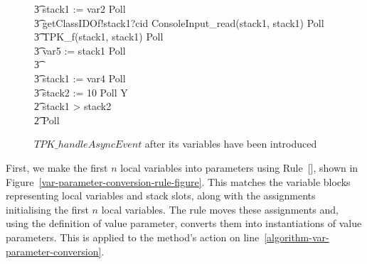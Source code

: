 \begin{figure}[tp!]
\begin{circusaction}
    \t3 stack1 := var2 \circseq Poll \circseq \\
    \t3 getClassIDOf!stack1?cid \then ConsoleInput\_read(stack1, stack1) \circseq Poll \circseq \\
    \t3 TPK\_f(stack1, stack1) \circseq Poll \circseq \\
    \t3 var5 := stack1 \circseq Poll \circseq \\
    \t3 {} \cdots {} \\
    \t3 stack1 := var4 \circseq Poll \circseq \\
    \t3 stack2 := 10 \circseq Poll \circseq Y \\
    \t2 {} \circelse stack1 > stack2 \circthen \Skip \\
    \t2 \circfi \circseq Poll
  \end{circusaction}
  \caption{$TPK\_handleAsyncEvent$ after its variables have been introduced}
  \label{efs-introduce-variables-mid-example-figure}
\end{figure}

First, we make the first $n$ local variables into parameters using
Rule~[], shown in
Figure~\ref{var-parameter-conversion-rule-figure}.
This matches the \Circus{} variable blocks representing local
variables and stack slots, along with the assignments initialising the
first $n$ local variables.
The rule moves these assignments and, using the definition of value
parameter, converts them into instantiations of value parameters.
This is applied to the method's action on
line~\ref{algorithm-var-parameter-conversion}.


